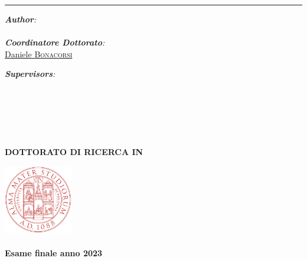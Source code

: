 \begin{titlepage}
  \doublespacing
  \large
  \hfill
  \vfill
  \vspace*{0.5cm}
  \begin{center}
    \doublespacing
    \textcolor{Maroon}{\huge\textbf{\myTitle}}
  \end{center}
  \vspace{1.25cm}
  \hrule
  \vspace{1.5cm}
  \onehalfspacing
  \begin{center}

    \begin{minipage}[t]{0.5\textwidth}
      \begin{flushleft}
        \emph{\textbf{Author}:}\\
        \href{\myWebsite}{{\myFirstName} \textsc{\myLastName}}\\[0.3cm]
        \emph{\textbf{Coordinatore Dottorato}:}\\
        \href{\myWebsite}{{Daniele} \textsc{Bonacorsi}}\\
      \end{flushleft}
    \end{minipage}
    \begin{minipage}[t]{0.4\textwidth}
      \begin{flushright}
        \emph{\textbf{Supervisors}:} \\
        \href{\myProfWebsite}{{\myProfTitle} {\myProfFirstName} \textsc{\myProfLastName}}\\
        \href{\myOtherProfWebsite}{{\myOtherProfTitle} {\myOtherProfFirstName} \textsc{\myOtherProfLastName}}\\
      \end{flushright}
    \end{minipage}\\[1.5cm]
    
    \myDepartment\\[0.5cm]
    \myFaculty\\[0.5cm]
    \textbf{DOTTORATO DI RICERCA IN}\\
    \mySchool

    \hfill
    \vfill

    \includegraphics[width=3cm]{figures/unibo.png}\\
    \href{https://unibo.it}{\myUni}\\[2em]
    \textbf{Esame finale anno 2023}
    \end{center}
\end{titlepage}